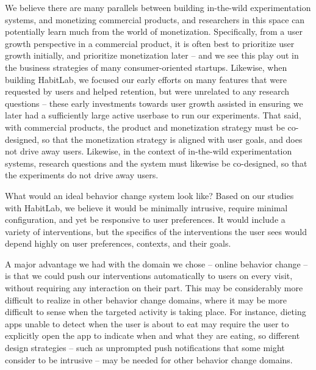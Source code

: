 We believe there are many parallels between building in-the-wild experimentation systems, and monetizing commercial products, and researchers in this space can potentially learn much from the world of monetization. Specifically, from a user growth perspective in a commercial product, it is often best to prioritize user growth initially, and prioritize monetization later -- and we see this play out in the business strategies of many consumer-oriented startups. Likewise, when building HabitLab, we focused our early efforts on many features that were requested by users and helped retention, but were unrelated to any research questions -- these early investments towards user growth assisted in ensuring we later had a sufficiently large active userbase to run our experiments. That said, with commercial products, the product and monetization strategy must be co-designed, so that the monetization strategy is aligned with user goals, and does not drive away users. Likewise, in the context of in-the-wild experimentation systems, research questions and the system must likewise be co-designed, so that the experiments do not drive away users.

What would an ideal behavior change system look like? Based on our studies with HabitLab, we believe it would be minimally intrusive, require minimal configuration, and yet be responsive to user preferences. It would include a variety of interventions, but the specifics of the interventions the user sees would depend highly on user preferences, contexts, and their goals.

A major advantage we had with the domain we chose -- online behavior change -- is that we could push our interventions automatically to users on every visit, without requiring any interaction on their part. This may be considerably more difficult to realize in other behavior change domains, where it may be more difficult to sense when the targeted activity is taking place. For instance, dieting apps unable to detect when the user is about to eat may require the user to explicitly open the app to indicate when and what they are eating, so different design strategies -- such as unprompted push notifications that some might consider to be intrusive -- may be needed for other behavior change domains.


